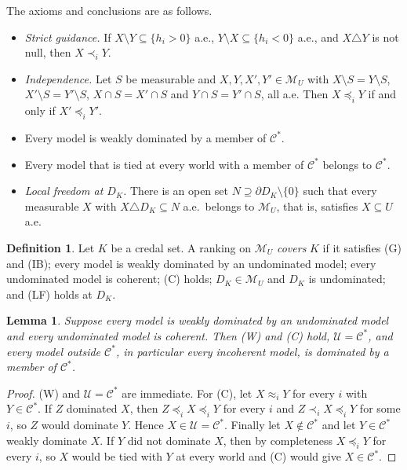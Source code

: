 \documentclass[11pt]{article}
\newcommand{\M}{\mathcal{M}}
\theoremstyle{plain}
\newtheorem{lemma}[theorem]{Lemma}
\theoremstyle{definition}
\newtheorem{definition}[theorem]{Definition}
\theoremstyle{remark}
\begin{document}
The axioms and conclusions are as follows.
\begin{itemize}
  \item[(G)] \emph{Strict guidance.} If $X\setminus Y\subseteq\{h_i>0\}$ a.e.,
  $Y\setminus X\subseteq\{h_i<0\}$ a.e., and $X\triangle Y$ is not null, then
  $X\prec_iY$.
  \item[(IB)] \emph{Independence.} Let $S$ be measurable and $X,Y,X',Y'\in\M_U$ with
  $X\setminus S=Y\setminus S$, $X'\setminus S=Y'\setminus S$, $X\cap S=X'\cap S$ and
  $Y\cap S=Y'\cap S$, all a.e. Then $X\preceq_iY$ if and only if $X'\preceq_iY'$.
  \item[(W)] Every model is weakly dominated by a member of $\mathcal C^\ast$.
  \item[(C)] Every model that is tied at every world with a member of $\mathcal C^\ast$
  belongs to $\mathcal C^\ast$.
  \item[(LF)] \emph{Local freedom at $D_K$.} There is an open set $N\supseteq\partial
  D_K\setminus\{0\}$ such that every measurable $X$ with $X\triangle D_K\subseteq N$ a.e.\
  belongs to $\M_U$, that is, satisfies $X\subseteq U$ a.e.
\end{itemize}

\begin{definition}\label{def:cover}
Let $K$ be a credal set. A ranking on $\M_U$ \emph{covers} $K$ if it satisfies (G) and
(IB); every model is weakly dominated by an undominated model; every undominated model is
coherent; (C) holds; $D_K\in\M_U$ and $D_K$ is undominated; and (LF) holds at $D_K$.
\end{definition}

\begin{lemma}\label{lem:dominance}
Suppose every model is weakly dominated by an undominated model and every undominated
model is coherent. Then (W) and (C) hold, $\mathcal U=\mathcal C^\ast$, and every model
outside $\mathcal C^\ast$, in particular every incoherent model, is dominated by a member
of $\mathcal C^\ast$.
\end{lemma}

\begin{proof}
(W) and $\mathcal U=\mathcal C^\ast$ are immediate. For (C), let $X\approx_iY$ for every
$i$ with $Y\in\mathcal C^\ast$. If $Z$ dominated $X$, then $Z\preceq_iX\preceq_iY$ for
every $i$ and $Z\prec_iX\preceq_iY$ for some $i$, so $Z$ would dominate $Y$. Hence
$X\in\mathcal U=\mathcal C^\ast$. Finally let $X\notin\mathcal C^\ast$ and let
$Y\in\mathcal C^\ast$ weakly dominate $X$. If $Y$ did not dominate $X$, then by
completeness $X\preceq_iY$ for every $i$, so $X$ would be tied with $Y$ at every world and
(C) would give $X\in\mathcal C^\ast$.
\end{proof}
\end{document}
